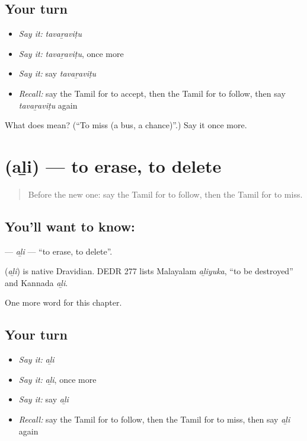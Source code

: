 \subsection*{Your turn}
\begin{itemize}
\raggedright
  \item \emph{Say it:} \emph{tavaṟaviṭu}
  \item \emph{Say it:} \emph{tavaṟaviṭu}, once more
  \item \emph{Say it:} say \emph{tavaṟaviṭu}
  \item \emph{Recall:} say the Tamil for to accept, then the Tamil for to follow, then say \emph{tavaṟaviṭu} again
\end{itemize}

\begin{tcolorbox}[breakable,colback=teal!4,colframe=teal!35!black,title={Before you move on}]
What does  mean? (\textquotedblleft{}To miss (a bus, a chance)\textquotedblright{}.) Say it once more.
\end{tcolorbox}
\section[\texorpdfstring{\ta{அழி} (aḻi)}{அழி (aḻi)}]{ (aḻi) — to erase, to delete}

\label{lesson:TA-C256-ali}



\begin{quote}
Before the new one: say the Tamil for to follow, then the Tamil for to miss.
\end{quote}

\subsection*{You'll want to know: }
\textbf{} — \emph{aḻi} — \textquotedblleft{}to erase, to delete\textquotedblright{}.

\begin{cousinweb}
\textbf{} (\emph{aḻi}) is native Dravidian. DEDR 277 lists Malayalam \emph{aḻiyuka}, \textquotedblleft{}to be destroyed\textquotedblright{} and Kannada \emph{aḻi}.
\end{cousinweb}

\begin{grammarlens}[title={What you've built}]
One more word for this chapter.
\end{grammarlens}

\subsection*{Your turn}
\begin{itemize}
\raggedright
  \item \emph{Say it:} \emph{aḻi}
  \item \emph{Say it:} \emph{aḻi}, once more
  \item \emph{Say it:} say \emph{aḻi}
  \item \emph{Recall:} say the Tamil for to follow, then the Tamil for to miss, then say \emph{aḻi} again
\end{itemize}

